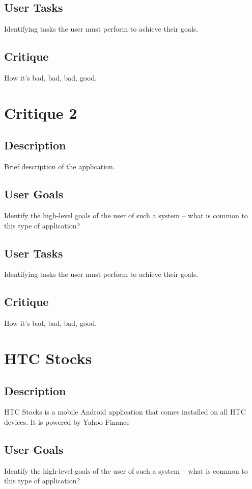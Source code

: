 \documentclass{sigchi}
\begin{document}
\subsection{User Tasks}
Identifying tasks the user must perform to achieve their goals.

\subsection{Critique}
How it's bad, bad, bad, good.



\section{Critique 2}
\subsection{Description}
Brief description of the application.

\subsection{User Goals}
Identify the high-level goals of the user of such a system – what is common to this type of
application?

\subsection{User Tasks}
Identifying tasks the user must perform to achieve their goals.

\subsection{Critique}
How it's bad, bad, bad, good.



\section{HTC Stocks}
\subsection{Description}
HTC Stocks is a mobile Android application that comes installed on all HTC devices.  It is powered by Yahoo Finance

\subsection{User Goals}
Identify the high-level goals of the user of such a system – what is common to this type of
application?
\end{document}
